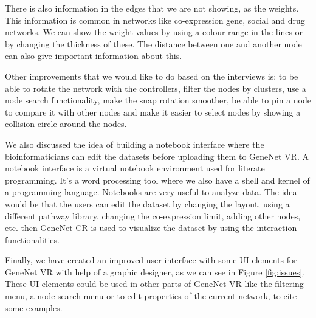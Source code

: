 There is also information in the edges that we are not showing, as the weights. This information is common in networks like co-expression gene, social and drug networks. We can show the weight values by using a colour range in the lines or by changing the thickness of these. The distance between one and another node can also give important information about this.

Other improvements that we would like to do based on the interviews is: to be able to rotate the network with the controllers, filter the nodes by clusters, use a node search functionality, make the snap rotation smoother, be able to pin a node to compare it with other nodes and make it easier to select nodes by showing a collision circle around the nodes.

We also discussed the idea of building a notebook interface where the bioinformaticians can edit the datasets before uploading them to GeneNet VR. A notebook interface is a virtual notebook environment used for literate programming. It's a word processing tool where we also have a shell and kernel of a programming language. Notebooks are very useful to analyze data. The idea would be that the users can edit the dataset by changing the layout, using a different pathway library, changing the co-expression limit, adding other nodes, etc. then GeneNet CR is used to visualize the dataset by using the interaction functionalities.

Finally, we have created an improved user interface with some UI elements for GeneNet VR with help of a graphic designer, as we can see in Figure \ref{fig:issues}. These UI elements could be used in other parts of GeneNet VR like the filtering menu, a node search menu or to edit properties of the current network, to cite some examples.
